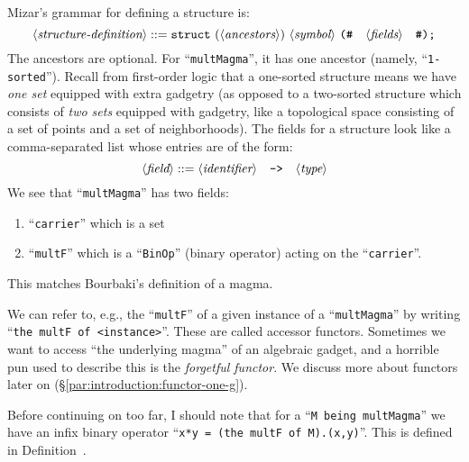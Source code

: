 Mizar's grammar for defining a structure is:
\begin{equation}
  \langle\textit{structure-definition}\rangle ::=
  \mbox{\texttt{struct}}~(\langle\textit{ancestors}\rangle)~\langle\textit{symbol}\rangle~
  \mbox{\texttt{(\#}}\quad
  \langle\textit{fields}\rangle\quad
  \mbox{\texttt{\#)}}
  \texttt{;}
\end{equation}
The ancestors are optional. For ``\lstinline{multMagma}'', it has one ancestor
(namely, ``\lstinline{1-sorted}''). Recall
from first-order logic that a one-sorted
structure means we have
\emph{one set} equipped with extra gadgetry (as opposed to a two-sorted
structure which consists of \emph{two sets} equipped with gadgetry, like
a topological space consisting of a set of points and a set of neighborhoods).
The fields for a structure look like a
comma-separated list whose entries are of the form:
\begin{equation}
  \langle\textit{field}\rangle ::= \langle\textit{identifier}\rangle\quad\mbox{\texttt{->}}\quad\langle\textit{type}\rangle
\end{equation}
We see that ``\texttt{multMagma}'' has two fields:
\begin{enumerate}
\item ``\texttt{carrier}'' which is a set
\item ``\texttt{multF}'' which is a ``\texttt{BinOp}'' (binary operator)
  acting on the ``\texttt{carrier}''.
\end{enumerate}
This matches Bourbaki's definition of a magma.

\begin{notation}
We can refer to, e.g., the ``\lstinline{multF}'' of a given instance of a
``\lstinline{multMagma}'' by writing
``\lstinline{the multF of <instance>}''. These are called accessor
functors. Sometimes we want to access ``the underlying magma'' of an
algebraic gadget, and a horrible pun used to describe this is the
\emph{forgetful functor}. We discuss more about
functors later on (\S\ref{par:introduction:functor-one-g}).
\end{notation}

\begin{aside}\label{rmk:introduction:multiplication-operator}
Before continuing on too far, I should note that for a
``\texttt{M being multMagma}'' we have an infix binary operator
``\texttt{x*y = (the multF of M).(x,y)}''. This is defined in
Definition~.
\end{aside}

